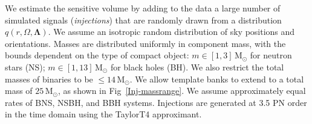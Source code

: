 \documentclass[12pt]{iopart} \usepackage{graphicx,amssymb}
\begin{document}
We estimate the sensitive volume by adding to the data a large number of
simulated signals (\emph{injections}) that are randomly drawn from a
distribution $q(r, \Omega, \mathbf{\Lambda})$. 
We assume an isotropic random distribution of sky positions and orientations.
Masses are distributed uniformly in component mass, with the bounds dependent
on the type of compact object: $m \in [1,3]\,\mathrm{M}_\odot$ for neutron
stars (NS); $m \in [1,13]\,\mathrm{M}_\odot$ for black holes (BH). We also
restrict the total masses of binaries to be $\leq 14\,\mathrm{M}_\odot$. We
allow template banks to extend to a total mass of $25\,\mathrm{M}_\odot$,
as shown in Fig~\ref{Inj-massrange}. We assume approximately equal rates of
BNS, NSBH, and BBH systems. Injections are generated at 3.5 PN order in the
time domain using the TaylorT4 approximant.
\end{document}
